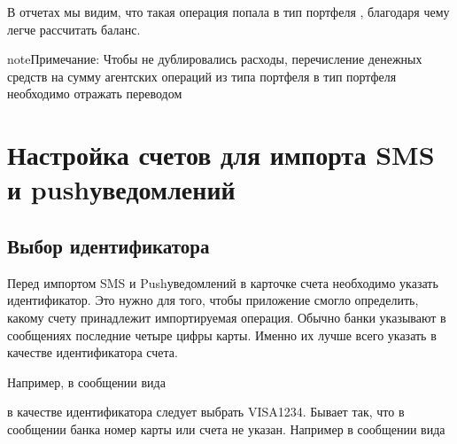 \documentclass[a4paper,10pt,russian]{sphinxmanual}
\begin{document}
\sphinxAtStartPar
В отчетах мы видим, что такая операция попала в тип портфеля ,
благодаря чему легче рассчитать баланс.

\noindent{}

\begin{sphinxadmonition}{note}{Примечание:}
\sphinxAtStartPar
Чтобы не дублировались расходы, перечисление денежных средств на сумму агентских операций из типа портфеля  в тип портфеля  необходимо отражать переводом
\end{sphinxadmonition}

\sphinxstepscope


\chapter{Настройка счетов для импорта SMS и push\sphinxhyphen{}уведомлений}
\label{\detokenize{account-identities:sms-push}}\label{\detokenize{account-identities:chapter-account-identities}}\label{\detokenize{account-identities::doc}}

\section{Выбор идентификатора}
\label{\detokenize{account-identities:id1}}
\sphinxAtStartPar
Перед импортом SMS и Push\sphinxhyphen{}уведомлений в карточке счета необходимо указать идентификатор. Это нужно для того,
чтобы приложение смогло определить, какому счету принадлежит импортируемая операция. Обычно банки
указывают  в сообщениях последние четыре цифры карты. Именно их лучше всего указать в качестве идентификатора счета.

\sphinxAtStartPar
Например, в сообщении вида

\begin{sphinxVerbatim}[commandchars=\\\{\}]
         
\end{sphinxVerbatim}

\sphinxAtStartPar
в качестве идентификатора следует выбрать VISA1234. Бывает так, что в сообщении банка номер карты или счета не указан.
Например в сообщении вида
\end{document}
